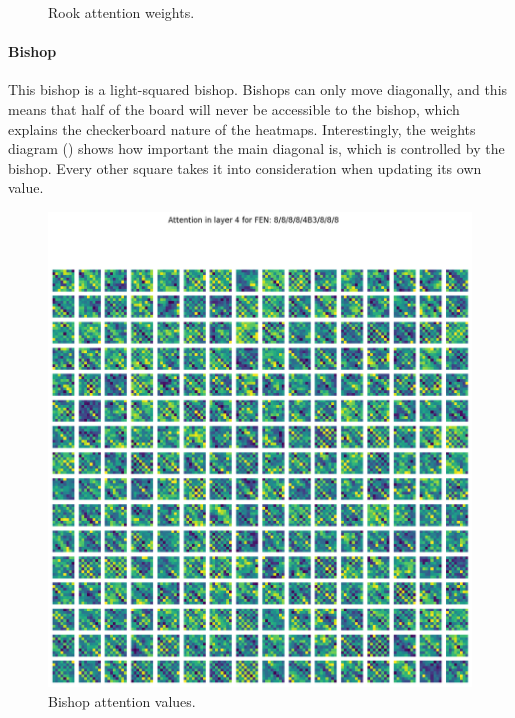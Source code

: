 \begin{figure}[H]
\begin{minipage}{0.475\textwidth}
    \caption{Rook attention weights.}
    \label{atnR}
  \end{minipage}
\end{figure}

\paragraph{Bishop} This bishop is a light-squared bishop. Bishops can only move
diagonally, and this means that half of the board will never be accessible to
the bishop, which explains the checkerboard nature of the heatmaps.
Interestingly, the weights diagram () shows how important the main
diagonal is, which is controlled by the bishop. Every other square takes it
into consideration when updating its own value.

\begin{figure}[H]
  \begin{minipage}{0.475\textwidth}
    \centering
    \includegraphics[width=\textwidth]{project/img/attention_maps/B_attention_4.png}
    \caption{Bishop attention values.}
    \label{atnB}
  \end{minipage}
  \hspace{0.05\textwidth}

\end{figure}
